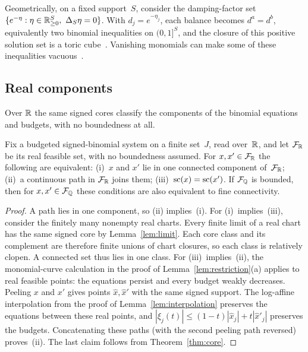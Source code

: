 Geometrically, on a fixed support~$S$, consider the damping-factor set
$\{e^{-\eta}:\eta\in\RR_{\ge0}^S,\ \Delta_S\eta=0\}$. With
$d_j=e^{-\eta_j}$, each balance becomes $d^a=d^b$, equivalently two
binomial inequalities on $(0,1]^S$, and the closure of this positive
solution set is a toric cube~\cite[Lemma~1 and Theorems~1--2]{toriccubes}.
Vanishing monomials can make some of these inequalities
vacuous~\cite[Example~3]{toriccubes}.

\subsection{Real components}\label{sec:real-components}

Over $\mathbb{R}$ the same signed cores classify the components of the binomial
equations and budgets, with no boundedness at all.

\begin{corollary}\label{cor:real}
Fix a budgeted signed-binomial system on a finite set~$J$, read over~$\mathbb{R}$,
and let $\mathcal F_{\mathbb{R}}$ be its real feasible set, with no boundedness assumed. For
$x,x'\in\mathcal F_{\mathbb{R}}$ the following are equivalent: (i)~$x$ and $x'$ lie in one
connected component of~$\mathcal F_{\mathbb{R}}$; (ii)~a continuous path in $\mathcal F_{\mathbb{R}}$ joins them;
(iii)~$\operatorname{sc}(x)=\operatorname{sc}(x')$. If $\mathcal F_{\mathbb{Q}}$ is bounded, then for $x,x'\in\mathcal F_{\mathbb{Q}}$ these
conditions are also equivalent to fine connectivity.
\end{corollary}

\begin{proof}
A path lies in one component, so (ii) implies~(i). For (i)~implies~(iii),
consider the finitely many nonempty real charts. Every finite
limit of a real chart has the same signed core by Lemma~\ref{lem:limit}.
Each core class and its complement are therefore finite unions of chart
closures, so each class is relatively clopen. A connected set thus lies in
one class. For (iii)~implies~(ii), the monomial-curve calculation in the
proof of Lemma~\ref{lem:restriction}(a) applies to real feasible points:
the equations persist and every budget weakly decreases. Peeling $x$ and
$x'$ gives points $\hat x,\hat x'$ with the same signed support. The
log-affine interpolation from the proof of Lemma~\ref{lem:interpolation}
preserves the equations between these real points, and
$|\xi_j(t)|\le(1-t)|\hat x_j|+t|\hat x'_j|$ preserves the budgets.
Concatenating these paths (with the second peeling path reversed) proves~(ii).
The last claim follows from Theorem~\ref{thm:core}.
\end{proof}

